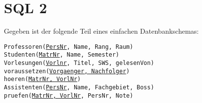 \section{SQL 2}
Gegeben ist der folgende Teil eines einfachen Datenbankschemas:

\texttt{Professoren(\underline{PersNr}, Name, Rang, Raum)}\\
\texttt{Studenten(\underline{MatrNr}, Name, Semester)}\\
\texttt{Vorlesungen(\underline{Vorlnr}, Titel, SWS, gelesenVon\normaltxt{[Professoren]})}\\
\texttt{voraussetzen(\underline{Vorgaenger\normaltxt{[Vorlesungen]}, Nachfolger\normaltxt{[Vorlesungen]}})}\\
\texttt{hoeren(\underline{MatrNr\normaltxt{[Studenten]}, VorlNr\normaltxt{[Vorlesungen]}})}\\
\texttt{Assistenten(\underline{PersNr}, Name, Fachgebiet, Boss\normaltxt{[Professoren]})}\\
\texttt{pruefen(\underline{MatrNr\normaltxt{[Studenten]}, VorlNr\normaltxt{[Vorlesungen]}}, PersNr\normaltxt{[Professoren]}, Note)}
\cprotEnv
